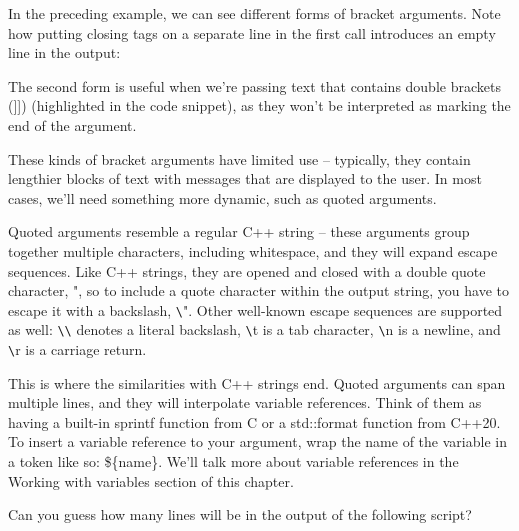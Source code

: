 In the preceding example, we can see different forms of bracket arguments. Note how putting closing tags on a separate line in the first call introduces an empty line in the output:


The second form is useful when we’re passing text that contains double brackets (]]) (highlighted in the code snippet), as they won’t be interpreted as marking the end of the argument.

These kinds of bracket arguments have limited use – typically, they contain lengthier blocks of text with messages that are displayed to the user. In most cases, we’ll need something more dynamic, such as quoted arguments.


Quoted arguments resemble a regular C++ string – these arguments group together multiple characters, including whitespace, and they will expand escape sequences. Like C++ strings, they are opened and closed with a double quote character, ", so to include a quote character within the output string, you have to escape it with a backslash, \verb|\|". Other well-known escape sequences are supported as well: \verb|\\| denotes a literal backslash, \verb|\|t is a tab character, \verb|\|n is a newline, and \verb|\|r is a carriage return.

This is where the similarities with C++ strings end. Quoted arguments can span multiple lines, and they will interpolate variable references. Think of them as having a built-in sprintf function from C or a std::format function from C++20. To insert a variable reference to your argument, wrap the name of the variable in a token like so: \$\{name\}. We’ll talk more about variable references in the Working with variables section of this chapter.

Can you guess how many lines will be in the output of the following script?



